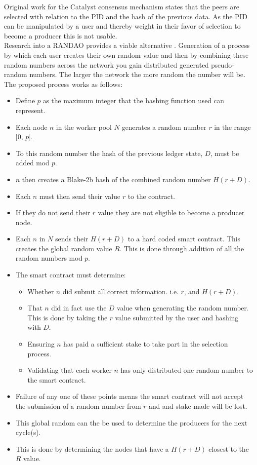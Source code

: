 Original work for the Catalyst consensus mechanism states that the peers are selected with relation to the PID and the hash of the previous data. As the PID can be manipulated by a user and thereby weight in their favor of selection to become a producer this is not usable. \\

Research into a RANDAO provides a viable alternative \cite{skvorc}\cite{randao}. Generation of a process by which each user creates their own random value and then by combining these random numbers across the network you gain distributed generated pseudo-random numbers. The larger the network the more random the number will be. The proposed process works as follows: \\

\begin{itemize}

\item Define $p$ as the maximum integer that the hashing function used can represent.
\item Each node $n$ in the worker pool $N$ generates a random number $r$ in the range [0, $p$].
\item To this random number the hash of the previous ledger state, $D$, must be added mod $p$.
\item $n$ then creates a Blake-2b hash of the combined random number $H(r + D)$.
\item Each $n$ must then send their value $r$ to the contract.
\item If they do not send their $r$ value they are not eligible to become a producer node.
\item Each $n$ in $N$ sends their $H(r + D)$ to a hard coded smart contract. This creates the global random value $R$. This is done through addition of all the random numbers mod $p$.
\item The smart contract must determine:
\begin{itemize}
\item Whether $n$ did submit all correct information. i.e. $r$, and $H(r+D)$.
\item That $n$ did in fact use the $D$ value when generating the random number. This is done by taking the $r$ value submitted by the user and hashing with $D$.
\item Ensuring $n$ has paid a sufficient stake to take part in the selection process.
\item Validating that each worker $n$ has only distributed one random number to the smart contract.
\end{itemize}
\item Failure of any one of these points means the smart contract will not accept the submission of a random number from $r$ and and stake made will be lost.
\item This global random can the be used to determine the producers for the next cycle(s).
\item This is done by determining the nodes that have a $H(r + D)$ closest to the $R$ value. \\

\end{itemize}

